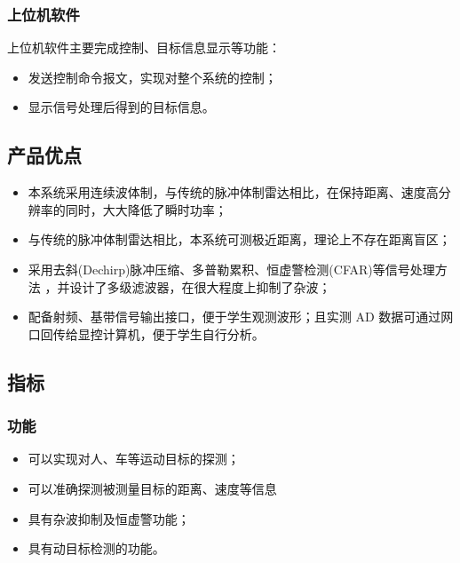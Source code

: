 \documentclass[../main]{subfiles}
\begin{document}
\subsubsection{上位机软件}%
\label{ssub:software}

上位机软件主要完成控制、目标信息显示等功能：

\begin{itemize}
  \item 发送控制命令报文，实现对整个系统的控制；
  \item 显示信号处理后得到的目标信息。
\end{itemize}

\subsection{产品优点}%
\label{sub:adventage}

\begin{itemize}
  \item 本系统采用连续波体制，与传统的脉冲体制雷达相比，在保持距离、速度高分
    辨率的同时，大大降低了瞬时功率；
  \item 与传统的脉冲体制雷达相比，本系统可测极近距离，理论上不存在距离盲区；
  \item 采用去斜(Dechirp)脉冲压缩、多普勒累积、恒虚警检测(CFAR)等信号处理方法
    ，并设计了多级滤波器，在很大程度上抑制了杂波；
  \item 配备射频、基带信号输出接口，便于学生观测波形；且实测 AD 数据可通过网
    口回传给显控计算机，便于学生自行分析。
\end{itemize}

\subsection{指标}%
\label{sub:index}

\subsubsection{功能}%
\label{ssub:function}

\begin{itemize}
  \item 可以实现对人、车等运动目标的探测；
  \item 可以准确探测被测量目标的距离、速度等信息
  \item 具有杂波抑制及恒虚警功能；
  \item 具有动目标检测的功能。
\end{itemize}
\end{document}
